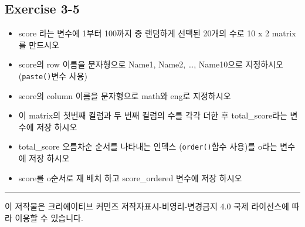 \documentclass[
]{book}
\providecommand{\tightlist}{%
  \setlength{\itemsep}{0pt}\setlength{\parskip}{0pt}}
\begin{document}
\hypertarget{exercise-3-5}{%
\subsection{Exercise 3-5}\label{exercise-3-5}}

\begin{itemize}
\tightlist
\item
  score 라는 변수에 1부터 100까지 중 랜덤하게 선택된 20개의 수로 10 x 2 matrix를 만드시오
\item
  score의 row 이름을 문자형으로 Name1, Name2, \ldots, Name10으로 지정하시오 (\texttt{paste()}변수 사용)
\item
  score의 column 이름을 문자형으로 math와 eng로 지정하시오
\item
  이 matrix의 첫번째 컬럼과 두 번째 컬럼의 수를 각각 더한 후 total\_score라는 변수에 저장 하시오
\item
  total\_score 오름차순 순서를 나타내는 인덱스 (\texttt{order()}함수 사용)를 o라는 변수에 저장 하시오
\item
  score를 o순서로 재 배치 하고 score\_ordered 변수에 저장 하시오
\end{itemize}

\begin{center}\rule{0.5\linewidth}{0.5pt}\end{center}

이 저작물은 크리에이티브 커먼즈 저작자표시-비영리-변경금지 4.0 국제 라이선스에 따라 이용할 수 있습니다.
\end{document}
